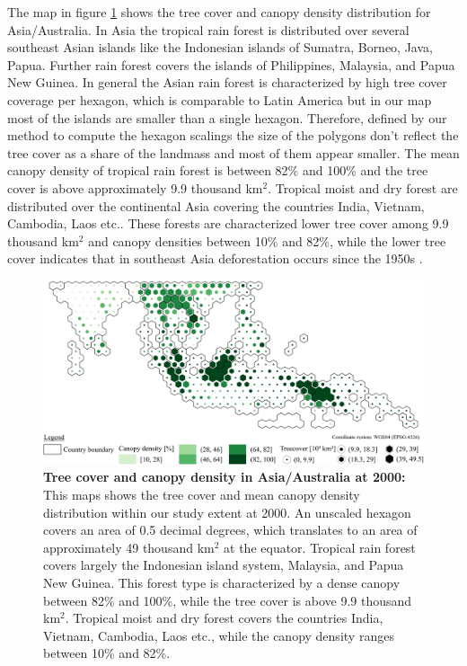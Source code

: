 			The map in figure \ref{fig:asia_tree_cover} shows the tree cover and canopy density distribution for Asia/Australia. In Asia the tropical rain forest is distributed over several southeast Asian islands like the Indonesian islands of Sumatra, Borneo, Java, Papua. Further rain forest covers the islands of Philippines, Malaysia, and Papua New Guinea. In general the Asian rain forest is characterized by high tree cover coverage per hexagon, which is comparable to Latin America but in our map most of the islands are smaller than a single hexagon. Therefore, defined by our method to compute the hexagon scalings the size of the polygons don't reflect the tree cover as a share of the landmass and most of them appear smaller. The mean canopy density of tropical rain forest is between 82\% and 100\% and the tree cover is above approximately 9.9 thousand km$^2$. Tropical moist and dry forest are distributed over the continental Asia covering the countries India, Vietnam, Cambodia, Laos etc.. These forests are characterized lower tree cover among 9.9 thousand km$^2$ and canopy densities between 10\% and 82\%, while the lower tree cover indicates that in southeast Asia deforestation occurs since the 1950s \citep{Kummer1994}. 
			\begin{figure}[ht]
				\centering
				\includegraphics[scale=1.]{img/asia_treecover_frameless}
				\caption[Tree cover and canopy density in Asia/Australia at 2000]{\textbf{Tree cover and canopy density in Asia/Australia at 2000:} This maps shows the tree cover and mean canopy density distribution within our study extent at 2000. An unscaled hexagon covers an area of 0.5 decimal degrees, which translates to an area of approximately 49 thousand km$^2$ at the equator. Tropical rain forest covers largely the Indonesian island system, Malaysia, and Papua New Guinea. This forest type is characterized by a dense canopy between 82\% and 100\%, while the tree cover is above 9.9 thousand km$^2$. Tropical moist and dry forest covers the countries India, Vietnam, Cambodia, Laos etc., while the canopy density ranges between 10\% and 82\%.}
				\label{fig:asia_tree_cover}
			\end{figure}

